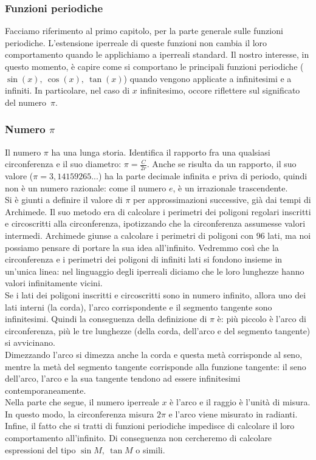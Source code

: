\subsubsection{Funzioni periodiche}
\label{subsubsec:insnum_periodiche}
Facciamo riferimento al primo capitolo, per la parte generale 
sulle funzioni periodiche. L'estensione iperreale di queste funzioni
non cambia il loro comportamento quando le applichiamo a iperreali standard.
Il nostro interesse, in questo momento, è capire come si comportano
le principali funzioni periodiche ($\sin(x),\ \cos(x),\ \tan(x)$)
quando vengono applicate a infinitesimi e a infiniti. In particolare,
nel caso di $x$ infinitesimo, occore riflettere sul significato del
numero~$\pi$.

\subsubsection{Numero $\pi$}
\label{subsubsec:insnum_pigreco}
Il numero $\pi$ ha una lunga storia. Identifica 
il rapporto fra una qualsiasi circonferenza e il suo diametro: $\pi=\frac{C}{2r}$. 
Anche se risulta da un rapporto, il suo valore ($\pi=3,14159265...$) 
ha la parte decimale infinita e priva di periodo, quindi non è un numero 
razionale: come il numero $e$, è un irrazionale trascendente.\\
Si è giunti a definire il valore di \(\pi\) per approssimazioni
successive, già dai tempi di Archimede. Il suo metodo era di
calcolare i perimetri dei poligoni regolari inscritti e
circoscritti alla circonferenza, ipotizzando che la circonferenza
assumesse valori intermedi. Archimede giunse a calcolare i perimetri
di poligoni con 96 lati, ma noi possiamo pensare di portare la sua idea
all'infinito. Vedremmo così che la circonferenza e i perimetri dei poligoni 
di infiniti lati si fondono insieme in un'unica linea: nel linguaggio degli
iperreali diciamo che le loro lunghezze hanno valori infinitamente vicini.\\
Se i lati dei poligoni inscritti e circoscritti sono in numero infinito,
allora uno dei lati interni (la corda), l'arco corrispondente e il segmento tangente
sono infinitesimi. Quindi la conseguenza della definizione di \(\pi\) è:
più piccolo è l'arco di circonferenza, più le tre lunghezze (della corda, 
dell'arco e del segmento tangente) si avvicinano.\\
Dimezzando l'arco si dimezza anche la corda e questa metà corrisponde al seno,
mentre la metà del segmento tangente corrisponde alla funzione tangente:
il seno dell'arco, l'arco e la sua tangente tendono  ad essere 
infinitesimi contemporaneamente.\\
Nella parte che segue, il numero iperreale $x$ è l'arco e il raggio è l'unità 
di misura. In questo modo, la circonferenza misura $2\pi$ e l'arco 
viene misurato in radianti.\\
Infine, il fatto che si tratti di funzioni periodiche impedisce di calcolare
il loro comportamento all'infinito. Di conseguenza non cercheremo di calcolare 
espressioni del tipo $\sin M,\ \tan M$ o simili.\\


